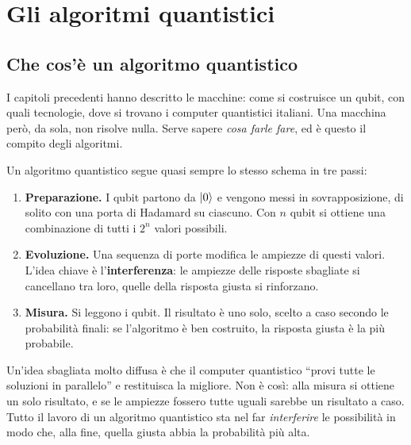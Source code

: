 \chapter{Gli algoritmi quantistici}
\label{chap:algoritmi}

\section{Che cos'è un algoritmo quantistico}
\label{sec:alg-intro}

I capitoli precedenti hanno descritto le macchine: come si costruisce un qubit,
con quali tecnologie, dove si trovano i computer quantistici italiani. Una
macchina però, da sola, non risolve nulla. Serve sapere \textit{cosa farle
fare}, ed è questo il compito degli algoritmi.

Un algoritmo quantistico segue quasi sempre lo stesso schema in tre passi:

\begin{enumerate}
  \item \textbf{Preparazione.} I qubit partono da $\ket{0}$ e vengono messi in
    sovrapposizione, di solito con una porta di Hadamard su ciascuno. Con $n$
    qubit si ottiene una combinazione di tutti i $2^n$ valori possibili.
  \item \textbf{Evoluzione.} Una sequenza di porte modifica le ampiezze di
    questi valori. L'idea chiave è l'\textbf{interferenza}: le ampiezze delle
    risposte sbagliate si cancellano tra loro, quelle della risposta giusta si
    rinforzano.
  \item \textbf{Misura.} Si leggono i qubit. Il risultato è uno solo, scelto a
    caso secondo le probabilità finali: se l'algoritmo è ben costruito, la
    risposta giusta è la più probabile.
\end{enumerate}

\begin{notabox}
  Un'idea sbagliata molto diffusa è che il computer quantistico ``provi tutte
  le soluzioni in parallelo'' e restituisca la migliore. Non è così: alla
  misura si ottiene un solo risultato, e se le ampiezze fossero tutte uguali
  sarebbe un risultato a caso. Tutto il lavoro di un algoritmo quantistico sta
  nel far \textit{interferire} le possibilità in modo che, alla fine, quella
  giusta abbia la probabilità più alta.
\end{notabox}

